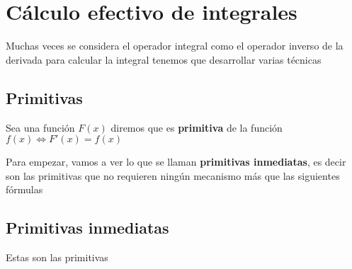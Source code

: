 \section{Cálculo efectivo de integrales}
\noindent
Muchas veces se considera el operador integral como el operador inverso de la derivada para calcular la integral tenemos que desarrollar varias técnicas 
\subsection*{Primitivas}
\begin{defi}
Sea una función $F(x)$ diremos que es \textbf{primitiva} de la función $f(x)\Leftrightarrow F'(x)=f(x)$
\end{defi}
\noindent
Para empezar, vamos a ver lo que se llaman \textbf{primitivas inmediatas}, es decir son las primitivas que no requieren ningún mecanismo más que las siguientes fórmulas

\subsection{Primitivas inmediatas}
Estas son las primitivas 




